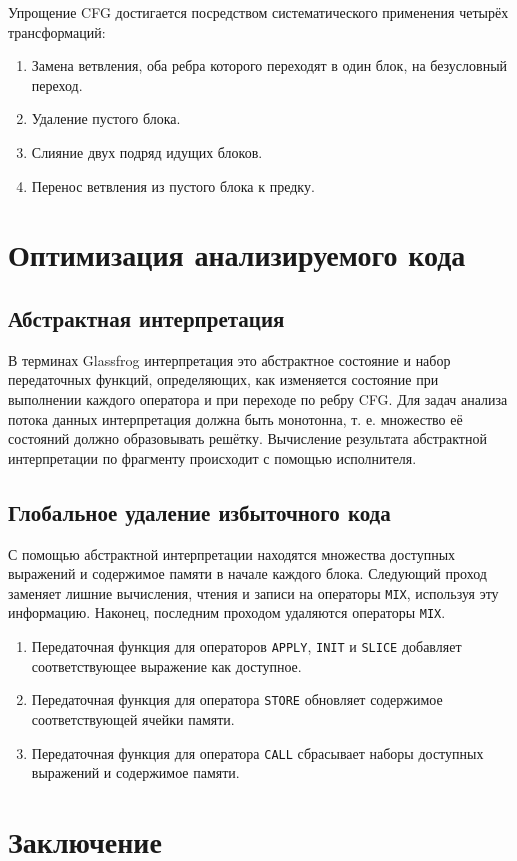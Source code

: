 \documentclass[11pt]{article}
\begin{document}
Упрощение CFG достигается посредством систематического применения четырёх трансформаций:
\begin{enumerate}
\item Замена ветвления, оба ребра которого переходят в один блок, на безусловный переход.
\item Удаление пустого блока.
\item Слияние двух подряд идущих блоков.
\item Перенос ветвления из пустого блока к предку.
\end{enumerate}
\section{Оптимизация анализируемого кода}
\label{sec:org3cfaa5b}
\subsection{Абстрактная интерпретация}
\label{sec:org7363e64}
В терминах Glassfrog интерпретация это абстрактное состояние и набор передаточных функций, определяющих, как изменяется состояние при выполнении каждого оператора и при переходе по ребру CFG. Для задач анализа потока данных интерпретация должна быть монотонна, т. е. множество её состояний должно образовывать решётку. Вычисление результата абстрактной интерпретации по фрагменту происходит с помощью исполнителя.
\subsection{Глобальное удаление избыточного кода}
\label{sec:org0f9cef9}
С помощью абстрактной интерпретации находятся множества доступных выражений и содержимое памяти в начале каждого блока. Следующий проход заменяет лишние вычисления, чтения и записи на операторы \texttt{MIX}, используя эту информацию. Наконец, последним проходом удаляются операторы \texttt{MIX}.
\begin{enumerate}
\item Передаточная функция для операторов \texttt{APPLY}, \texttt{INIT} и \texttt{SLICE} добавляет соответствующее выражение как доступное.
\item Передаточная функция для оператора \texttt{STORE} обновляет содержимое соответствующей ячейки памяти.
\item Передаточная функция для оператора \texttt{CALL} сбрасывает наборы доступных выражений и содержимое памяти.
\end{enumerate}
\section{Заключение}
\label{sec:org7ebff81}
\end{document}
